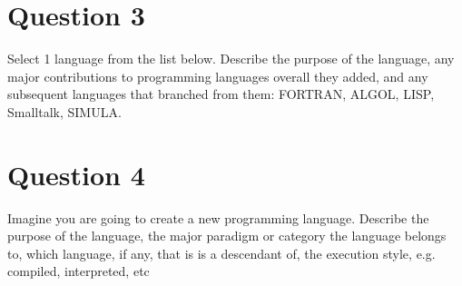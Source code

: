 \documentclass{article}
\begin{document}
\section*{Question 3}
Select 1 language from the list below. Describe the purpose of the language, any major contributions to programming languages overall they added, and any subsequent languages that branched from them: FORTRAN, ALGOL, LISP, Smalltalk, SIMULA.

\subsection*{}

\section*{Question 4}
Imagine you are going to create a new programming language. Describe the purpose of the language, the major paradigm or category the language belongs to, which language, if any, that is is a descendant of, the execution style, e.g. compiled, interpreted, etc
\end{document}
